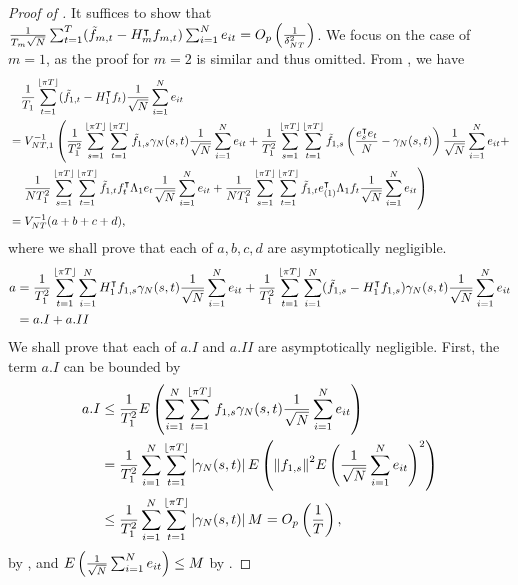 \documentclass[12pt]{article}
\newcommand*{\tran}{\intercal}
\theoremstyle{plain}
\numberwithin{equation}{section}
\begin{document}
\begin{proof}[Proof of ]
It suffices to show that $\frac{1}{T_m \sqrt{N}} \sumT (\tilde{f}_{m, t} - H_m ^\tran f_{m, t}) \sumN e_{it} = \Opdeltasq$. We focus on the case of $m = 1$, as the proof for $m = 2$ is similar and thus omitted. From , we have
\begin{align*}
&\quad \frac{1}{T_1} \sumTfloor (\tilde{f}_{1, t} - H_1^\tran f_{t}) \frac{1}{\sqrt{N}} \sumN e_{it} \\
&= V_{NT, 1}^{-1} \left(
\frac{1}{T_1^2} \sumTfloors \sumTfloor \tilde{f}_{1, s} \gamma_{N}(s, t) \frac{1}{\sqrt{N}} \sumN e_{it} +
\frac{1}{T_1^2} \sumTfloors \sumTfloor \tilde{f}_{1, s} \left( \frac{e_{s}^\tran e_{t}}{N} - \gamma_{N}(s, t) \right) \frac{1} {\sqrt{N}} \sumN e_{it} + \right. \\
&\quad
\left. 
\frac{1}{NT_1^2} \sumTfloors \sumTfloor \tilde{f}_{1, t} f_{t}^\tran \Lambda_1 e_{t} \frac{1}{\sqrt{N}} \sumN e_{it} +
\frac{1}{NT_1^2} \sumTfloors \sumTfloor \tilde{f}_{1, t} e_{(1)}^\tran \Lambda_1 f_{t} \frac{1}{\sqrt{N}} \sumN e_{it}
\right) \\
&= V_{NT}^{-1}(a + b + c + d),
\end{align*}
where we shall prove that each of $a, b, c, d$ are asymptotically negligible. 
\begin{align*}
a &= \frac{1}{T_1^2} \sumTfloor \sumN H_1^\tran f_{1, s} \gamma_{N}(s, t) \frac{1}{\sqrt{N}} \sumN e_{it} +
\frac{1}{T_1^2} \sumTfloor \sumN (\tilde{f}_{1, s} - H_1^\tran f_{1, s}) \gamma_{N}(s, t) \frac{1}{\sqrt{N}} \sumN e_{it} \\
&= a.I + a.II
\end{align*}
We shall prove that each of $a.I$ and $a.II$ are asymptotically negligible. First, the term $a.I$ can be bounded by
\begin{align*}
a.I 
&\leq \frac{1}{T_1^2} E\left( \sum_{i = 1}^{N} \sum_{t = 1}^{\left \lfloor \pi T \right \rfloor} f_{1, s} \gamma_{N}(s, t) \frac{1}{\sqrt{N}} \sum_{i = 1}^{N} e_{it} \right)  \\
&= \frac{1}{T_1^2} \sum_{i = 1}^{N} \sum_{t = 1}^{\left \lfloor \pi T \right \rfloor} \left| \gamma_N(s, t) \right| E\left( \norm{f_{1, s}}^2 E \left( \frac{1}{\sqrt{N}} \sum_{i = 1}^{N} e_{it} \right)^2 \right) \\
&\leq \frac{1}{T_1^2} \sum_{i = 1}^{N} \sum_{t = 1}^{\left \lfloor \pi T \right \rfloor} \left| \gamma_N(s, t) \right| M = O_p \left( \frac{1}{T} \right),
\end{align*}
by , and $E \left( \frac{1}{\sqrt{N}} \sum_{i = 1}^{N} e_{it} \right) \leq M$ by .

\end{proof}
\end{document}
